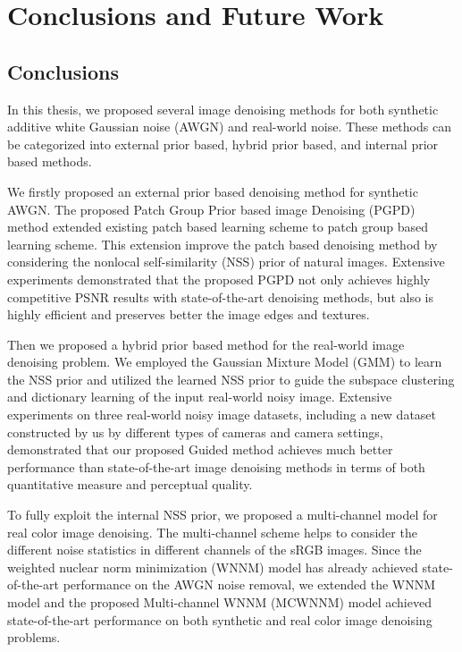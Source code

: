%
\chapter{Conclusions and Future Work}
\label{sec:conclusions}


\section{Conclusions}
\label{sec:conclusions:sec1}
In this thesis, we proposed several image denoising methods for both synthetic additive white Gaussian noise (AWGN) and real-world noise. These methods can be categorized into external prior based, hybrid prior based, and internal prior based methods.

We firstly proposed an external prior based denoising method for synthetic AWGN. The proposed Patch Group Prior based image Denoising (PGPD) method extended existing patch based learning scheme \cite{epll} to patch group based learning scheme. This extension improve the patch based denoising method by considering the nonlocal self-similarity (NSS) prior of natural images. Extensive experiments demonstrated that the proposed PGPD not only achieves highly competitive PSNR results with state-of-the-art denoising methods, but also is highly efficient and preserves better the image edges and textures.

Then we proposed a hybrid prior based method for the real-world image denoising problem. We employed the Gaussian Mixture Model (GMM) to learn the NSS prior and utilized the learned NSS prior to guide the subspace clustering and dictionary learning of the input real-world noisy image. Extensive experiments on three real-world noisy image datasets, including a new dataset constructed by us by different types of cameras and camera settings, demonstrated that our proposed Guided method achieves much better performance than state-of-the-art image denoising methods in terms of both quantitative measure and perceptual quality.

To fully exploit the internal NSS prior, we proposed a multi-channel model for real color image denoising. The multi-channel scheme helps to consider the different noise statistics in different channels of the sRGB images. Since the weighted nuclear norm minimization (WNNM) model has already achieved state-of-the-art performance on the AWGN noise removal, we extended the WNNM model and the proposed Multi-channel WNNM (MCWNNM) model achieved state-of-the-art performance on both synthetic and real color image denoising problems. 

